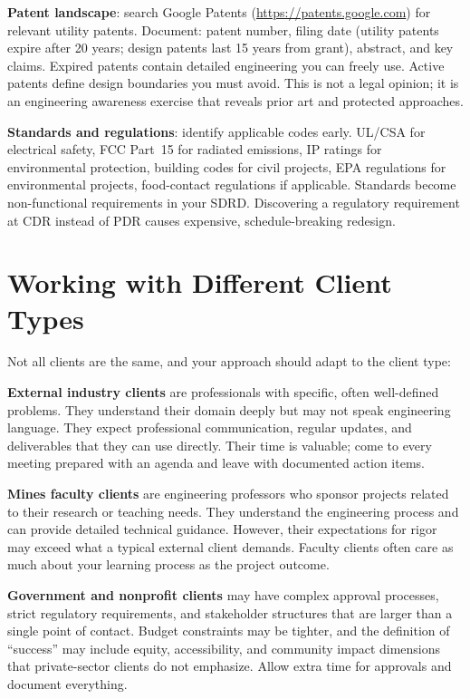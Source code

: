 \textbf{Patent landscape}: search Google Patents (\url{https://patents.google.com}) for relevant utility patents. Document: patent number, filing date (utility patents expire after 20 years; design patents last 15 years from grant), abstract, and key claims. Expired patents contain detailed engineering you can freely use. Active patents define design boundaries you must avoid. This is not a legal opinion; it is an engineering awareness exercise that reveals prior art and protected approaches.

\textbf{Standards and regulations}: identify applicable codes early. UL/CSA for electrical safety, FCC Part~15 for radiated emissions, IP ratings for environmental protection, building codes for civil projects, EPA regulations for environmental projects, food-contact regulations if applicable. Standards become non-functional requirements in your SDRD. Discovering a regulatory requirement at CDR instead of PDR causes expensive, schedule-breaking redesign.

\section{Working with Different Client Types}
Not all clients are the same, and your approach should adapt to the client type:

\textbf{External industry clients} are professionals with specific, often well-defined problems. They understand their domain deeply but may not speak engineering language. They expect professional communication, regular updates, and deliverables that they can use directly. Their time is valuable; come to every meeting prepared with an agenda and leave with documented action items.

\textbf{Mines faculty clients} are engineering professors who sponsor projects related to their research or teaching needs. They understand the engineering process and can provide detailed technical guidance. However, their expectations for rigor may exceed what a typical external client demands. Faculty clients often care as much about your learning process as the project outcome.

\textbf{Government and nonprofit clients} may have complex approval processes, strict regulatory requirements, and stakeholder structures that are larger than a single point of contact. Budget constraints may be tighter, and the definition of ``success'' may include equity, accessibility, and community impact dimensions that private-sector clients do not emphasize. Allow extra time for approvals and document everything.

